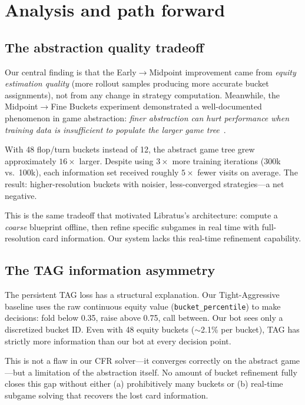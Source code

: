 \documentclass{article}
\begin{document}
\section{Analysis and path forward}

\subsection{The abstraction quality tradeoff}

Our central finding is that the Early$\to$Midpoint improvement came from \textit{equity estimation quality} (more rollout samples producing more accurate bucket assignments), not from any change in strategy computation. Meanwhile, the Midpoint$\to$Fine Buckets experiment demonstrated a well-documented phenomenon in game abstraction: \textit{finer abstraction can hurt performance when training data is insufficient to populate the larger game tree}~\cite{waugh2009abstraction}.

With 48 flop/turn buckets instead of 12, the abstract game tree grew approximately $16\times$ larger. Despite using $3\times$ more training iterations (300k vs.\ 100k), each information set received roughly $5\times$ fewer visits on average. The result: higher-resolution buckets with noisier, less-converged strategies---a net negative.

This is the same tradeoff that motivated Libratus's architecture: compute a \textit{coarse} blueprint offline, then refine specific subgames in real time with full-resolution card information. Our system lacks this real-time refinement capability.

\subsection{The TAG information asymmetry}

The persistent TAG loss has a structural explanation. Our Tight-Aggressive baseline uses the raw continuous equity value (\texttt{bucket\_percentile}) to make decisions: fold below 0.35, raise above 0.75, call between. Our bot sees only a discretized bucket ID. Even with 48 equity buckets ($\sim$2.1\% per bucket), TAG has strictly more information than our bot at every decision point.

This is not a flaw in our CFR solver---it converges correctly on the abstract game---but a limitation of the abstraction itself. No amount of bucket refinement fully closes this gap without either (a) prohibitively many buckets or (b) real-time subgame solving that recovers the lost card information.
\end{document}
